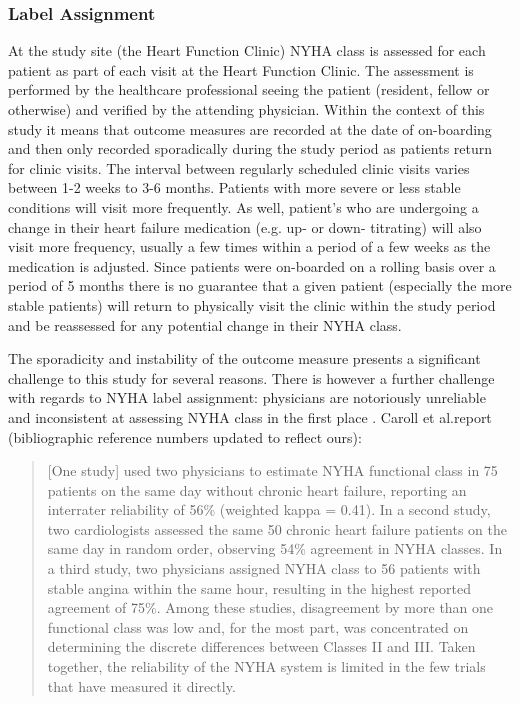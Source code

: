 \documentclass[]{article}
\begin{document}
\subsubsection{Label Assignment}

At the study site (the Heart Function Clinic) NYHA class is assessed for each patient as part of each visit at the Heart Function Clinic. The assessment is performed by the healthcare professional seeing the patient (resident, fellow or otherwise) and verified by the attending physician. Within the context of this study it means that outcome measures are recorded at the date of on-boarding and then only recorded sporadically during the study period as patients return for clinic visits. The interval between regularly scheduled clinic visits varies between 1-2 weeks to 3-6 months. Patients with more severe or less stable conditions will visit more frequently. As well, patient's who are undergoing a change in their heart failure medication (e.g. up- or down- titrating) will also visit more frequency, usually a few times within a period of a few weeks as the medication is adjusted. Since patients were on-boarded on a rolling basis over a period of 5 months there is no guarantee that a given patient (especially the more stable patients) will return to physically visit the clinic within the study period and be reassessed for any potential change in their NYHA class. %

The sporadicity and instability of the outcome measure presents a significant challenge to this study for several reasons. There is however a further challenge with regards to NYHA label assignment: physicians are notoriously unreliable and inconsistent at assessing NYHA class in the first place \cite{Carroll2014,Goldman1981a,Christensen2006,Raphael2007a,Kubo2004}. Caroll et al.\@ report (bibliographic reference numbers updated to reflect ours):

\blockquote{[One study] used two physicians to estimate NYHA functional class in 75 patients on the same day without chronic heart failure, reporting an interrater reliability of 56\% (weighted kappa = 0.41)\cite{Goldman1981a}. In a second study, two cardiologists assessed the same 50 chronic heart failure patients on the same day in random order, observing 54\% agreement in NYHA classes\cite{Raphael2007a}. In a third study, two physicians assigned NYHA class to 56 patients with stable angina within the same hour, resulting in the highest reported agreement of 75\%\cite{Christensen2006}. Among these studies, disagreement by more than one functional class was low and, for the most part, was concentrated on determining the discrete differences between Classes II and III. Taken together, the reliability of the NYHA system is limited in the few trials that have measured it directly. \cite{Carroll2014}}
\end{document}
